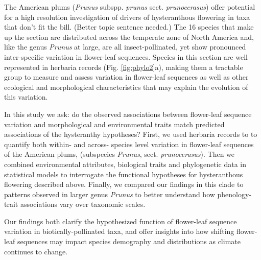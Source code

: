 \documentclass{article}[11pt]
\begin{document}
The American plums (\textit{Prunus} subspp. \textit{prunus} sect. \textit{prunocerasus}) offer potential for a high resolution investigation of drivers of hysteranthous flowering in taxa that don't fit the bill. (Better topic sentence needed.) The 16 species that make up the section are distributed across the temperate zone of North America and, like the genus \textit{Prunus} at large, are all insect-pollinated, yet show pronounced inter-specific variation in flower-leaf sequences.  Species in this section are well represented in herbaria records (Fig. \ref{fig:phylo2}a), making them a tractable group to measure and assess variation in flower-leaf sequences as well as other ecological and morphological characteristics that may explain the evolution of this variation. 

\noindent In this study we ask: do the observed associations between flower-leaf sequence variation and morphological and environmental traits match predicted associations of the hysteranthy hypotheses? 
First, we used herbaria records to to quantify both within- and across- species level variation in flower-leaf sequences of the American plums, (subspecies  \textit{Prunus}, sect. \textit{prunocerasus}).
Then we combined environmental attributes, biological traits and phylogenetic data in statistical models to interrogate the functional hypotheses for hysteranthous flowering described above. Finally, we compared our findings in this clade to patterns observed in larger genus \emph{Prunus} to better understand how phenology-trait associations vary over taxonomic scales.

Our findings both clarify the hypothesized function of flower-leaf sequence variation in biotically-pollinated taxa, and offer insights into how shifting flower-leaf sequences may impact species demography and distributions as climate continues to change.

\end{document}

